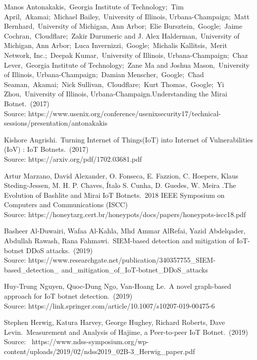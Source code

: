 \documentclass[conference]{IEEEtran}
\begin{document}
\begin{thebibliography}{00}

Manos Antonakakis, Georgia Institute of Technology; Tim April, Akamai; Michael Bailey, University of Illinois, Urbana-Champaign; Matt Bernhard, University of Michigan, Ann Arbor; Elie Bursztein, Google; Jaime Cochran, Cloudflare; Zakir Durumeric and J. Alex Halderman, University of Michigan, Ann Arbor; Luca Invernizzi, Google; Michalis Kallitsis, Merit Network, Inc.; Deepak Kumar, University of Illinois, Urbana-Champaign; Chaz Lever, Georgia Institute of Technology; Zane Ma and Joshua Mason, University of Illinois, Urbana-Champaign; Damian Menscher, Google; Chad Seaman, Akamai; Nick Sullivan, Cloudflare; Kurt Thomas, Google; Yi Zhou, University of Illinois, Urbana-Champaign.Understanding the Mirai Botnet. (2017)
\\Source: https://www.usenix.org/conference/usenixsecurity17/technical-sessions/presentation/antonakakis


 Kishore Angrishi. Turning Internet of Things(IoT) into Internet of Vulnerabilities (IoV) : IoT Botnets. (2017)
\\Source: https://arxiv.org/pdf/1702.03681.pdf

 Artur Marzano, David Alexander, O. Fonseca, E. Fazzion, C. Hoepers, Klaus Steding-Jessen, M. H. P. Chaves, Ítalo S. Cunha, D. Guedes, W. Meira .The Evolution of Bashlite and Mirai IoT Botnets. 2018 IEEE Symposium on Computers and Communications (ISCC) 
\\Source: https://honeytarg.cert.br/honeypots/docs/papers/honeypots-iscc18.pdf


Basheer Al-Duwairi, Wafaa Al-Kahla, Mhd Ammar AlRefai, Yazid Abdelqader, Abdullah Rawash, Rana Fahmawi. SIEM-based detection and mitigation of IoT-botnet DDoS attacks. (2019) 
\\Source: https://www.researchgate.net/publication/340357755\_SIEM-based\_detection\_
and\_mitigation\_of\_IoT-botnet\_DDoS\_attacks


Huy-Trung Nguyen, Quoc-Dung Ngo, Van-Hoang Le. A novel graph-based approach for IoT botnet detection. (2019) 
\\Source: https://link.springer.com/article/10.1007/s10207-019-00475-6


Stephen Herwig, Katura Harvey, George Hughey, Richard Roberts, Dave Levin. Measurement and Analysis of Hajime, a Peer-to-peer IoT Botnet. (2019) 
\\Source:  https://www.ndss-symposium.org/wp-content/uploads/2019/02/ndss2019\_02B-3\_Herwig\_paper.pdf



\end{thebibliography}
\end{document}

